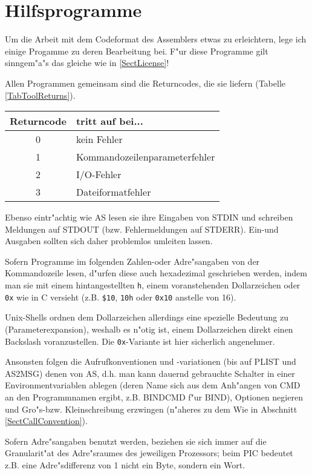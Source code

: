 \documentclass[12pt,a4paper,twoside]{report}
\newcommand{\tty}[1]{{\tt #1}}
\begin{document}

\cleardoublepage
\chapter{Hilfsprogramme}
\label{ChapTools}

Um die Arbeit mit dem Codeformat des Assemblers etwas zu erleichtern,
lege ich einige Progamme zu deren Bearbeitung bei.  F"ur diese Programme
gilt sinngem"a"s das gleiche wie in \ref{SectLicense}!

Allen Programmen gemeinsam sind die Returncodes, die sie liefern (Tabelle
\ref{TabToolReturns}).
\par
\begin{table*}[ht]
\begin{center}\begin{tabular}{|c|l|}
\hline
Returncode &  tritt auf bei... \\
\hline
\hline
0          &  kein Fehler \\
1          &  Kommandozeilenparameterfehler \\
2          &  I/O-Fehler \\
3          &  Dateiformatfehler \\
\hline
\end{tabular}\end{center}
\caption{Returncodes der Dienstprogramme\label{TabToolReturns}}
\end{table*}
Ebenso eintr"achtig wie AS lesen sie ihre Eingaben von STDIN und schreiben
Meldungen auf STDOUT (bzw. Fehlermeldungen auf STDERR).  Ein-und
Ausgaben sollten sich daher problemlos umleiten lassen.
\par
Sofern Programme im folgenden Zahlen-oder Adre"sangaben von der
Kommandozeile lesen, d"urfen diese auch hexadezimal geschrieben werden,
indem man sie mit einem hintangestellten \tty{h}, einem voranstehenden
Dollarzeichen oder \tty{0x} wie in C versieht (z.B. \verb!$10!,
\verb!10h! oder \verb!0x10! anstelle von 16).
\par
Unix-Shells  ordnen dem Dollarzeichen allerdings
eine spezielle Bedeutung zu (Parameterexpansion), weshalb es n"otig ist,
einem Dollarzeichen direkt einen Backslash voranzustellen.  Die
\tty{0x}-Variante ist hier sicherlich angenehmer.
\par
Ansonsten folgen die Aufrufkonventionen und -variationen (bis auf PLIST
und AS2MSG) denen von AS, d.h. man kann dauernd gebrauchte Schalter in
einer Environmentvariablen ablegen (deren Name sich aus dem Anh"angen von
CMD an den Programmnamen ergibt, z.B. BINDCMD f"ur BIND), Optionen
negieren und Gro"s-bzw. Kleinschreibung erzwingen (n"aheres zu dem Wie in
Abschnitt \ref{SectCallConvention}).
\par
Sofern Adre"sangaben benutzt werden, beziehen sie sich immer auf die
Granularit"at des Adre"sraumes des jeweiligen Prozessors; beim PIC bedeutet
z.B. eine Adre"sdifferenz von 1 nicht ein Byte, sondern ein Wort.
\end{document}
